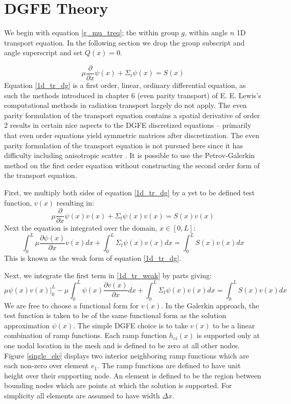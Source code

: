 \section{DGFE Theory}

We begin with equation \ref{g_mu_treq}; the within group $g$, within angle $n$ 1D transport equation.  In the following section we drop the group subscript and angle superscript and set $Q(x)=0$.

\begin{equation}
\mu \frac{\partial}{\partial x} \psi(x) + \Sigma_t \psi(x) = S(x)
\label{1d_tr_dg}
\end{equation}
Equation \ref{1d_tr_dg} is a first order, linear, ordinary differential equation, as such the methods introduced in chapter 6
(even parity transport) of E. E. Lewis’s computational methods in radiation transport largely do not apply. The even parity formulation of the transport equation contains a spatial derivative of order 2 results
in certain nice aspects to the DGFE discretized equations – primarily that even order equations yield
symmetric matrices after discretization. The even parity formulation of the transport equation is not pursued here
since it has difficulty including anisotropic scatter \cite{Lewis}. It is possible to use the Petrov-Galerkin method
on the first order equation without constructing the second order form of the transport equation.

First, we multiply both sides of equation \ref{1d_tr_dg} by a yet to be defined test function, $v(x)$ resulting in:
\begin{equation}
\mu \frac{\partial}{\partial x} \psi(x) v(x) + \Sigma_t \psi(x)v(x) = S(x)v(x)
\label{1d_tr_dg2}
\end{equation}
Next the equation is integrated over the domain, $x \in [0, L]$:
\begin{equation}
\int_0^L \mu \frac{\partial \psi(x)}{\partial x} v(x) dx + \int_0^L \Sigma_t \psi(x)v(x) dx =  \int_0^L S(x)v(x) dx
\label{1d_tr_weak}
\end{equation}
This is known as the weak form of equation \ref{1d_tr_dg}.

Next, we integrate the first term in \ref{1d_tr_weak} by parts giving:
\begin{equation}
\mu \psi(x)v(x)|_0^L- \mu \int_0^L  \psi(x) \frac{\partial v(x)}{\partial x} dx + \int_0^L \Sigma_t \psi(x)v(x) dx =  \int_0^L S(x)v(x) dx
\label{1d_tr_weak2}
\end{equation}
We are free to choose a functional form for $v(x)$. In the Galerkin approach, the test function is
taken to be of the same functional form as the solution approximation $\psi(x)$. The simple DGFE choice is to take $v(x)$ to be a
linear combination of ramp functions. Each ramp function $h_{ei}(x)$ is supported only at one nodal location in the mesh
and is defined to be zero at all other nodes. Figure \ref{single_ele} displays two interior neighboring ramp functions which are each non-zero over element $e_1$. The ramp functions are defined to have unit height over their supporting node.  An element is defined to be the region between bounding nodes which are points at which the solution is supported.  For simplicity all elements are assumed to have width $\Delta x$.

